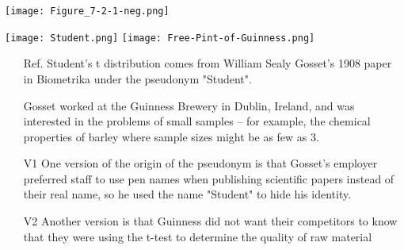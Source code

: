 \begin{frame}

	\begin{center}
		\texttt{[image: Figure\_7-2-1-neg.png]}
	\end{center}
\end{frame}
\begin{frame}
\centering
	\texttt{[image: Student.png]}
	\hspace{3em}
	\texttt{[image: Free-Pint-of-Guinness.png]}
	\vfill
\footnotesize
	\begin{enumerate}
		\item[Ref.] Student's t distribution comes from William Sealy Gosset's 1908 paper in Biometrika under the pseudonym "Student".
		\item[] Gosset worked at the Guinness Brewery in Dublin, Ireland, and was interested in the problems of small samples -- for example, the chemical properties of barley where sample sizes might be as few as 3.
		\item[V1] One version of the origin of the pseudonym is that Gosset's employer preferred staff to use pen names when publishing scientific papers instead of their real name, so he used the name "Student" to hide his identity.
	\item[V2] Another version is that Guinness did not want their competitors to know that they were using the t-test to determine the quality of raw material
	\end{enumerate}
\end{frame}
